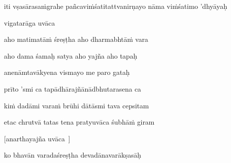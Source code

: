 \jump
\begin{center}
\ketdanda iti vṣasārasaṁgrahe pañcaviṁśatitattvanirṇayo nāma viṁśatimo 'dhyāyaḥ\ketdanda
\end{center}
\dontdisplaylinenum\vers 
{}
\bekveg\szamveg\vfill\phpspagebreak\szam\bek{}
\thispagestyle{empty}


\vers


\jump\jump

vigatarāga uvāca~{\dandab}\dontdisplaylinenum 

aho matimatāṁ śreṣṭha aho dharmabhtāṁ vara\thinspace{\danda} \dontdisplaylinenum

aho dama śamaḥ satya aho yajña aho tapaḥ \veg\dontdisplaylinenum
{}

anenāmtavākyena vismayo me paro gataḥ\thinspace{\dandab} \dontdisplaylinenum

prīto 'smi ca tapādhārajñānādbhutarasena ca \veg\dontdisplaylinenum
{}

kiṁ dadāmi varaṁ brūhi dātāsmi tava cepsitam\thinspace{\dandab} \dontdisplaylinenum

etac chrutvā tatas tena pratyuvāca śubhāṁ giram \veg\dontdisplaylinenum
{}

[anarthayajña uvāca~{\dandab}\dontdisplaylinenum ]

ko bhavān varadaśreṣṭha devadānavarākṣasāḥ\thinspace{\danda} \dontdisplaylinenum

